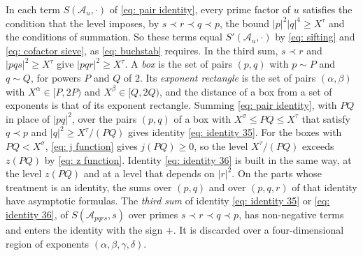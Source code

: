 \documentclass{article}
\numberwithin{equation}{section}
\newcommand{\Le}{\leqslant}
\newcommand{\Ge}{\geqslant}
\begin{document}
In each term $S(\mathcal{A}_u, \cdot)$ of \eqref{eq: pair identity}, every prime factor of $u$ satisfies the condition that the level imposes, by $s \prec r \prec q \prec p$, the bound $|p|^2|q|^4 \Ge X^{\tau}$ and the conditions of summation. So these terms equal $S'(\mathcal{A}_u, \cdot)$ by \eqref{eq: sifting} and \eqref{eq: cofactor sieve}, as \eqref{eq: buchstab} requires. In the third sum, $s \prec r$ and $|pqs|^2 \Ge X^{\tau}$ give $|pqr|^2 \Ge X^{\tau}$. A \emph{box} is the set of pairs $(p, q)$ with $p \sim P$ and $q \sim Q$, for powers $P$ and $Q$ of $2$. Its \emph{exponent rectangle} is the set of pairs $(\alpha, \beta)$ with $X^{\alpha} \in [P, 2P)$ and $X^{\beta} \in [Q, 2Q)$, and the distance of a box from a set of exponents is that of its exponent rectangle. Summing \eqref{eq: pair identity}, with $PQ$ in place of $|pq|^2$, over the pairs $(p, q)$ of a box with $X^{\sigma} \Le PQ \Le X^{\tau}$ that satisfy $q \prec p$ and $|q|^2 \Ge X^{\tau}/(PQ)$ gives identity \eqref{eq: identity 35}. For the boxes with $PQ < X^{\sigma}$, \eqref{eq: j function} gives $j(PQ) \Ge 0$, so the level $X^{\tau}/(PQ)$ exceeds $z(PQ)$ by \eqref{eq: z function}. Identity \eqref{eq: identity 36} is built in the same way, at the level $z(PQ)$ and at a level that depends on $|r|^2$. On the parts whose treatment is an identity, the sums over $(p, q)$ and over $(p, q, r)$ of that identity have asymptotic formulas. The \emph{third sum} of identity \eqref{eq: identity 35} or \eqref{eq: identity 36}, of $S(\mathcal{A}_{pqrs}, s)$ over primes $s \prec r \prec q \prec p$, has non-negative terms and enters the identity with the sign $+$. It is discarded over a four-dimensional region of exponents $(\alpha, \beta, \gamma, \delta)$.
\end{document}
